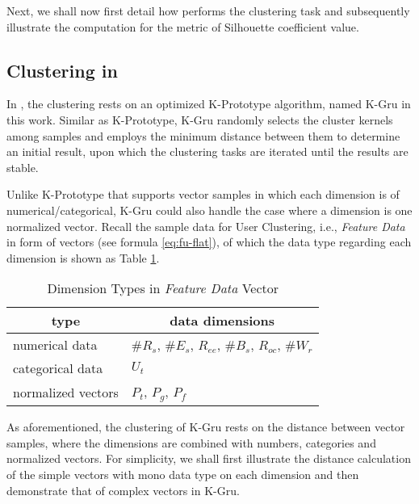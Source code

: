 Next, we shall now first detail how \sys{} performs the clustering task and subsequently illustrate the computation for the metric of Silhouette coefficient value.

\subsection{Clustering in \sys{}}
\label{sec:cluster}

In \sys{}, the clustering rests on an optimized K-Prototype \cite{IEEEexample:huang1997clustering} algorithm, named K-Gru in this work.
Similar as K-Prototype, K-Gru randomly selects the cluster kernels among samples and employs the minimum distance between them to determine an initial result, upon which the clustering tasks are iterated until the results are stable.

Unlike K-Prototype that supports vector samples in which each dimension is of numerical/categorical, K-Gru could also handle the case where a dimension is one normalized vector.
%
Recall the sample data for User Clustering, i.e., \textit{Feature Data} in form of vectors (see formula \ref{eq:fu-flat}), of which the data type regarding each dimension is shown as Table \ref{tbl:data-type}.

\begin{table}[!htb]
\centering
\begin{small}
\caption{Dimension Types in \textit{Feature Data} Vector}
\vspace{0.3cm}
\label{tbl:data-type}
\begin{tabular}{ll}
\toprule
\multicolumn{1}{c}{\textbf{type}} & \multicolumn{1}{c}{\textbf{data dimensions}}	\\	\midrule \midrule
numerical data				& $\#R_s$, $\#E_s$, $R_{ee}$, $\#B_s$, $R_{oc}$, $\#W_r$				\\	\midrule
categorical data			& $U_t$				\\	\midrule
normalized vectors			& $P_t$, $P_g$, $P_f$			\\ \bottomrule
\end{tabular}
\end{small}
\end{table}

As aforementioned, the clustering of K-Gru rests on the distance between vector samples, where the dimensions are combined with numbers, categories and normalized vectors.
For simplicity, we shall first illustrate the distance calculation of the simple vectors with mono data type on each dimension and then demonstrate that of complex vectors in K-Gru.


